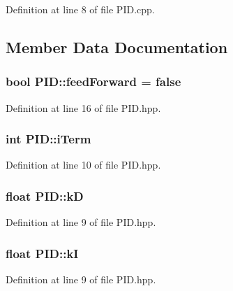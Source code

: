 Definition at line 8 of file P\-I\-D.\-cpp.



\subsection{Member Data Documentation}
\hypertarget{classPID_aaad110febd9150a54528b9cb6ff145e8}{
\subsubsection[{feed\-Forward}]{\setlength{\rightskip}{0pt plus 5cm}bool P\-I\-D\-::feed\-Forward = false}}\label{classPID_aaad110febd9150a54528b9cb6ff145e8}


Definition at line 16 of file P\-I\-D.\-hpp.

\hypertarget{classPID_a0ab15f9f3e6d301b25696a32469ba3eb}{
\subsubsection[{i\-Term}]{\setlength{\rightskip}{0pt plus 5cm}int P\-I\-D\-::i\-Term}}\label{classPID_a0ab15f9f3e6d301b25696a32469ba3eb}


Definition at line 10 of file P\-I\-D.\-hpp.

\hypertarget{classPID_a5a07dca1e267a62af08ebd07781f1e9e}{
\subsubsection[{k\-D}]{\setlength{\rightskip}{0pt plus 5cm}float P\-I\-D\-::k\-D}}\label{classPID_a5a07dca1e267a62af08ebd07781f1e9e}


Definition at line 9 of file P\-I\-D.\-hpp.

\hypertarget{classPID_ac686925341bcab06b11df109533b6807}{
\subsubsection[{k\-I}]{\setlength{\rightskip}{0pt plus 5cm}float P\-I\-D\-::k\-I}}\label{classPID_ac686925341bcab06b11df109533b6807}


Definition at line 9 of file P\-I\-D.\-hpp.

